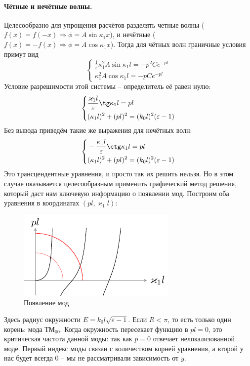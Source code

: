\paragraph{Чётные и нечётные волны. } Целесообразно для упрощения расчётов разделять четные волны ($f(x)=f(-x) \Rightarrow \phi = A\sin \kappa_1 x$), и нечётные ($f(x)=-f(x) \Rightarrow \phi=A\cos\kappa_1 x$). Тогда для чётных волн граничные условия примут вид
\begin{equation}
    \left\{\begin{aligned}
            \frac{1}{\varepsilon}\kappa_1^2 A\sin\kappa_1 l = -p^2 C e^{-pl}\\
            \kappa_1^2 A \cos \kappa_1 l = -p C e^{-pl} 
    \end{aligned}\right.
\end{equation}
Условие разрешимости этой системы -- определитель её равен нулю:
\begin{equation}
    \left\{\begin{aligned}
            &\frac{\varkappa_1 l}{\varepsilon} \tg \kappa_1 l = pl\\
            &(\kappa_1 l)^2 +  (pl)^2 = (k_0 l)^2 (\varepsilon-1)
    \end{aligned}\right.
\end{equation}
Без вывода приведём такие же выражения для нечётных волн:
\begin{equation}
    \left\{\begin{aligned}
        &-\frac{\kappa_1 l}{\varepsilon} \ctg \kappa_1 l = pl\\
        &(\kappa_1 l)^2 +  (pl)^2 = (k_0 l)^2 (\varepsilon-1)
    \end{aligned}\right.
\end{equation}
Это трансцендентные уравнения, и просто так их решить нельзя. Но в этом случае оказывается целесообразным применить графический метод решения, который даст нам ключевую информацию о появлении мод. Построим оба уравнения в координатах $(pl, \varkappa_1 l)$:
\begin{figure}[H]
    \centering
    \includegraphics[scale=1.5]{img3/1}
    \caption{Появление мод}
    \label{fig:}
\end{figure}
Здесь радиус окружности $E=k_0 l \sqrt{\varepsilon-1}$. Если $R<\pi$, то есть только один корень: мода ТМ${}_{00}$. Когда окружность пересекает функцию в $pl=0$, это критическая частота данной моды: так как $p=0$ отвечает нелокализованной моде. Первый индекс моды связан с количеством корней уравнения, а второй у нас будет всегда 0 -- мы не рассматривали зависимость от $y$.
